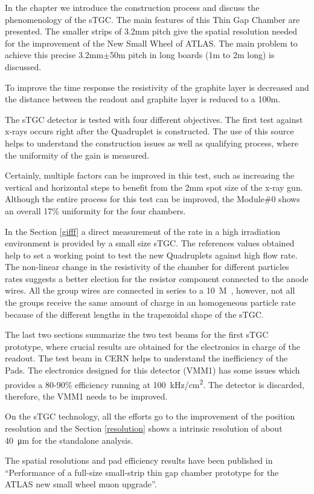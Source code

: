 In the chapter we introduce the construction process and discuss the phenomenology of the sTGC. The main features of
this Thin Gap Chamber are presented. The smaller strips of 3.2mm pitch give the spatial resolution needed for the
improvement of the New Small Wheel of ATLAS. The main problem to achieve this precise 3.2mm$\pm$50\micro m pitch in long
boards (1m to 2m long) is discussed.\par
To improve the time response the resistivity of the graphite layer is decreased and the distance between the readout and
graphite layer is reduced to a 100\micro m.\par

The sTGC detector is tested with four different objectives. The first test against x-rays occurs right after the Quadruplet is
constructed. The use of this source helps to understand the construction issues as well as qualifying process, where
the uniformity of the gain is measured.\par

Certainly, multiple factors can be improved in this test, such as increasing the vertical and horizontal steps to benefit from the 2mm spot size of the x-ray gun. 
Although the entire process for this test can be improved, the Module\#0 shows an overall 17\% uniformity for the four
chambers.\par

In the Section \ref{gifff} a direct measurement of the rate in a high irradiation environment is provided by a small size
sTGC. The references values obtained help to set a working point to test the new Quadruplets against high flow rate.
The non-linear change in the resistivity of the chamber for different particles rates suggests a better election for the
resistor component connected to the anode wires. All the group wires are connected in series to a \SI{10}{M\Omega},
however, not all the groups receive the same amount of charge in an homogeneous particle rate because of the different
lengths in the trapezoidal shape of the sTGC. \par

The last two sections summarize the two test beams for the first sTGC prototype, where crucial results are obtained for
the electronics in charge of the readout. The test beam in CERN helps to understand the inefficiency of the Pads.
The electronics designed for this detector (VMM1) has some issues which provides a 80-90\% efficiency running at
\SI{100}{kHz/\cm^2}. The detector is discarded, therefore, the VMM1 needs to be improved. \par

On the sTGC technology, all the efforts go to the improvement of the position resolution and the Section
\ref{resolution} shows a intrinsic resolution of about \SI{40}{\micro m} for the standalone analysis.\par

The spatial resolutions and pad efficiency results have been published in ``Performance of a full-size small-strip thin gap chamber prototype
for the ATLAS new small wheel muon upgrade''\cite{performance}.
